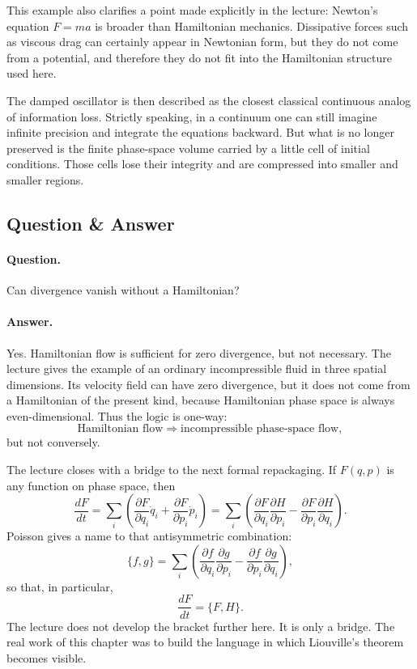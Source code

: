 This example also clarifies a point made explicitly in the lecture: Newton's equation \(F=ma\) is broader than Hamiltonian mechanics. Dissipative forces such as viscous drag can certainly appear in Newtonian form, but they do not come from a potential, and therefore they do not fit into the Hamiltonian structure used here.

The damped oscillator is then described as the closest classical continuous analog of information loss. Strictly speaking, in a continuum one can still imagine infinite precision and integrate the equations backward. But what is no longer preserved is the finite phase-space volume carried by a little cell of initial conditions. Those cells lose their integrity and are compressed into smaller and smaller regions.

\subsection{Question \& Answer}

\paragraph{Question.} Can divergence vanish without a Hamiltonian?

\paragraph{Answer.} Yes. Hamiltonian flow is sufficient for zero divergence, but not necessary. The lecture gives the example of an ordinary incompressible fluid in three spatial dimensions. Its velocity field can have zero divergence, but it does not come from a Hamiltonian of the present kind, because Hamiltonian phase space is always even-dimensional. Thus the logic is one-way:
\begin{equation}
\text{Hamiltonian flow}
\Longrightarrow
\text{incompressible phase-space flow},
\end{equation}
but not conversely.

The lecture closes with a bridge to the next formal repackaging. If \(F(q,p)\) is any function on phase space, then
\begin{equation}
\frac{dF}{dt}
=
\sum_i\left(
\frac{\partial F}{\partial q_i}\dot q_i
+
\frac{\partial F}{\partial p_i}\dot p_i
\right)
=
\sum_i\left(
\frac{\partial F}{\partial q_i}\frac{\partial H}{\partial p_i}
-
\frac{\partial F}{\partial p_i}\frac{\partial H}{\partial q_i}
\right).
\end{equation}
Poisson gives a name to that antisymmetric combination:
\begin{equation}
\{f,g\}
=
\sum_i\left(
\frac{\partial f}{\partial q_i}\frac{\partial g}{\partial p_i}
-
\frac{\partial f}{\partial p_i}\frac{\partial g}{\partial q_i}
\right),
\end{equation}
so that, in particular,
\begin{equation}
\frac{dF}{dt}=\{F,H\}.
\end{equation}
The lecture does not develop the bracket further here. It is only a bridge. The real work of this chapter was to build the language in which Liouville's theorem becomes visible.

